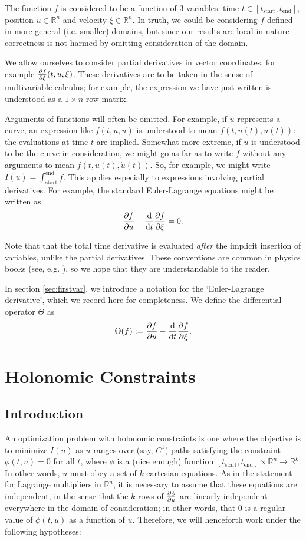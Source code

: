 \documentclass{article}
\theoremstyle{plain}
\theoremstyle{plain}
\theoremstyle{nonumberplain}
\theoremstyle{empty}
\newcommand{\R}{\mathbb{R}}
\newcommand{\tstart}{\mathrm{start}}
\newcommand{\tend}{\mathrm{end}}
\begin{document}
The function $f$ is considered to be a function of 3 variables: time $t \in [t_\tstart, t_\tend]$, position $u \in \R^n$ and velocity $\xi \in \R^n$. In truth, we could be considering $f$ defined in more general (i.e. smaller) domains, but since our results are local in nature correctness is not harmed by omitting consideration of the domain.

We allow ourselves to consider partial derivatives in vector coordinates, for example $\diffp f \xi (t, u, \xi)$. These derivatives are to be taken in the sense of multivariable calculus; for example, the expression we have just written is understood as a $1 \times n$ row-matrix.

Arguments of functions will often be omitted. For example, if $u$ represents a curve, an expression like $f(t,u,\dot u)$ is understood to mean $f(t,u(t),\dot u(t))$: the evaluations at time $t$ are implied. Somewhat more extreme, if $u$ is understood to be the curve in consideration, we might go as far as to write $f$ without any arguments to mean $f(t,u(t),\dot u(t))$. So, for example, we might write $I(u) = \int_\tstart^\tend f$. This applies especially to expressions involving partial derivatives. For example, the standard Euler-Lagrange equations might be written as
\[\diffp f u - \diff*{\diffp f \xi}t = 0.\]

Note that that the total time derivative is evaluated \emph{after} the implicit insertion of variables, unlike the partial derivatives. These conventions are common in physics books (see, e.g. \cite{goldstein}), so we hope that they are understandable to the reader.

In section \ref{sec:firstvar}, we introduce a notation for the `Euler-Lagrange derivative', which we record here for completeness. We define the differential operator $\Theta$ as
\[\Theta(f) := \diffp f u - \diff*{\diffp f \xi}t.\]

\section{Holonomic Constraints}

\subsection{Introduction}

An optimization problem with holonomic constraints is one where the objective is to minimize $I(u)$ as $u$ ranges over (say, $C^1$) paths satisfying the constraint $\phi(t, u) = 0$ for all $t$, where $\phi$ is a (nice enough) function $[t_\tstart, t_\tend] \times \R^n \to \R^k$. In other words, $u$ must obey a set of $k$ cartesian equations. As in the statement for Lagrange multipliers in $\R^n$, it is necessary to assume that these equations are independent, in the sense that the $k$ rows of $\diffp \phi u$ are linearly independent everywhere in the domain of consideration; in other words, that 0 is a regular value of $\phi(t, u)$ as a function of $u$. Therefore, we will henceforth work under the following hypotheses:
\end{document}
